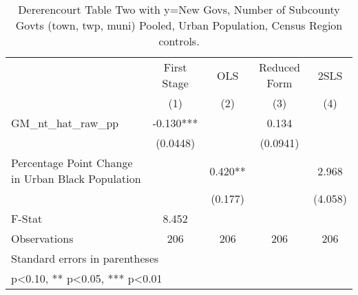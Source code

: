 \begin{table}[htbp]\centering
\def\sym#1{\ifmmode^{#1}\else\(^{#1}\)\fi}
\caption{Dererencourt Table Two with y=New Govs, Number of Subcounty Govts (town, twp, muni)  Pooled, Urban Population, Census Region controls.}
\begin{tabular}{l*{4}{c}}
\toprule
                    & First Stage   &         OLS   &Reduced Form   &        2SLS   \\
                    &\multicolumn{1}{c}{(1)}   &\multicolumn{1}{c}{(2)}   &\multicolumn{1}{c}{(3)}   &\multicolumn{1}{c}{(4)}   \\
\midrule
GM\_nt\_hat\_raw\_pp    &      -0.130***&               &       0.134   &               \\
                    &    (0.0448)   &               &    (0.0941)   &               \\
\addlinespace
Percentage Point Change in Urban Black Population&               &       0.420** &               &       2.968   \\
                    &               &     (0.177)   &               &     (4.058)   \\
\midrule
F-Stat              &       8.452   &               &               &               \\
Observations        &         206   &         206   &         206   &         206   \\
\bottomrule
\multicolumn{5}{l}{\footnotesize Standard errors in parentheses}\\
\multicolumn{5}{l}{\footnotesize * p<0.10, ** p<0.05, *** p<0.01}\\
\end{tabular}
\end{table}
